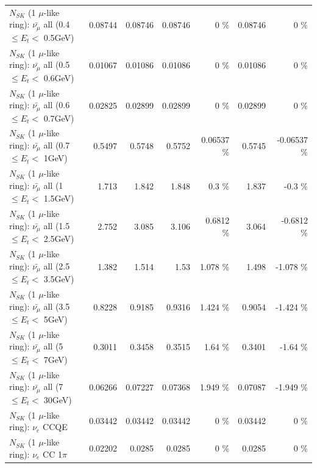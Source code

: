 \begin{table}
\begin{tabular}{| l | r | r | r  r | r  r |}
 $N_{SK}$ (1 $\mu$-like ring): $\bar{\nu_{\mu}}$ all (0.4 $\leq E_{t} <$ 0.5GeV) &         0.08744 &         0.08746 &         0.08746 &        0 \%  &         0.08746 &        0 \%  \\ 
 $N_{SK}$ (1 $\mu$-like ring): $\bar{\nu_{\mu}}$ all (0.5 $\leq E_{t} <$ 0.6GeV) &         0.01067 &         0.01086 &         0.01086 &        0 \%  &         0.01086 &        0 \%  \\ 
 $N_{SK}$ (1 $\mu$-like ring): $\bar{\nu_{\mu}}$ all (0.6 $\leq E_{t} <$ 0.7GeV) &         0.02825 &         0.02899 &         0.02899 &        0 \%  &         0.02899 &        0 \%  \\ 
   $N_{SK}$ (1 $\mu$-like ring): $\bar{\nu_{\mu}}$ all (0.7 $\leq E_{t} <$ 1GeV) &          0.5497 &          0.5748 &          0.5752 &  0.06537 \%  &          0.5745 & -0.06537 \%  \\ 
   $N_{SK}$ (1 $\mu$-like ring): $\bar{\nu_{\mu}}$ all (1 $\leq E_{t} <$ 1.5GeV) &           1.713 &           1.842 &           1.848 &      0.3 \%  &           1.837 &     -0.3 \%  \\ 
 $N_{SK}$ (1 $\mu$-like ring): $\bar{\nu_{\mu}}$ all (1.5 $\leq E_{t} <$ 2.5GeV) &           2.752 &           3.085 &           3.106 &   0.6812 \%  &           3.064 &  -0.6812 \%  \\ 
 $N_{SK}$ (1 $\mu$-like ring): $\bar{\nu_{\mu}}$ all (2.5 $\leq E_{t} <$ 3.5GeV) &           1.382 &           1.514 &            1.53 &    1.078 \%  &           1.498 &   -1.078 \%  \\ 
   $N_{SK}$ (1 $\mu$-like ring): $\bar{\nu_{\mu}}$ all (3.5 $\leq E_{t} <$ 5GeV) &          0.8228 &          0.9185 &          0.9316 &    1.424 \%  &          0.9054 &   -1.424 \%  \\ 
     $N_{SK}$ (1 $\mu$-like ring): $\bar{\nu_{\mu}}$ all (5 $\leq E_{t} <$ 7GeV) &          0.3011 &          0.3458 &          0.3515 &     1.64 \%  &          0.3401 &    -1.64 \%  \\ 
    $N_{SK}$ (1 $\mu$-like ring): $\bar{\nu_{\mu}}$ all (7 $\leq E_{t} <$ 30GeV) &         0.06266 &         0.07227 &         0.07368 &    1.949 \%  &         0.07087 &   -1.949 \%  \\ 
\hline
\hline
\hline
                                      $N_{SK}$ (1 $\mu$-like ring): $\nu_e$ CCQE &         0.03442 &         0.03442 &         0.03442 &        0 \%  &         0.03442 &        0 \%  \\ 
                                 $N_{SK}$ (1 $\mu$-like ring): $\nu_e$ CC 1$\pi$ &         0.02202 &          0.0285 &          0.0285 &        0 \%  &          0.0285 &        0 \%  \\ 

\end{tabular}
\end{table}
